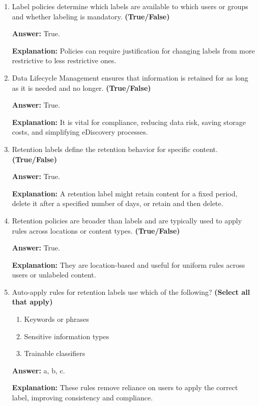 \documentclass[10pt]{article}
\begin{document}
\begin{enumerate}[leftmargin=*]
\textbf{Explanation:} Encryption restricts who can open, read, edit, print, or copy. Content markings include headers, footers, and watermarks. Access restrictions control external sharing and unmanaged devices.

\item Label policies determine which labels are available to which users or groups and whether labeling is mandatory. \textbf{(True/False)}

\textbf{Answer:} True.

\textbf{Explanation:} Policies can require justification for changing labels from more restrictive to less restrictive ones.

\item Data Lifecycle Management ensures that information is retained for as long as it is needed and no longer. \textbf{(True/False)}

\textbf{Answer:} True.

\textbf{Explanation:} It is vital for compliance, reducing data risk, saving storage costs, and simplifying eDiscovery processes.

\item Retention labels define the retention behavior for specific content. \textbf{(True/False)}

\textbf{Answer:} True.

\textbf{Explanation:} A retention label might retain content for a fixed period, delete it after a specified number of days, or retain and then delete.

\item Retention policies are broader than labels and are typically used to apply rules across locations or content types. \textbf{(True/False)}

\textbf{Answer:} True.

\textbf{Explanation:} They are location-based and useful for uniform rules across users or unlabeled content.

\item Auto-apply rules for retention labels use which of the following? \textbf{(Select all that apply)}
\begin{enumerate}[label=\alph*., leftmargin=1.5em]
\item Keywords or phrases
\item Sensitive information types
\item Trainable classifiers
\end{enumerate}
\textbf{Answer:} a, b, c.

\textbf{Explanation:} These rules remove reliance on users to apply the correct label, improving consistency and compliance.


\end{enumerate}
\end{document}
